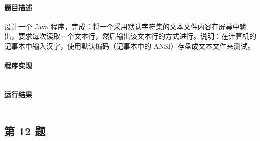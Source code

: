 \documentclass{academics}
\begin{document}
\paragraph{题目描述} {
    设计一个 Java 程序，完成：将一个采用默认字符集的文本文件内容在屏幕中输出，要求每次读取一个文本行，然后输出该文本行的方式进行。说明：在计算机的记事本中输入汉字，使用默认编码（记事本中的 ANSI）存盘成文本文件来测试。
}

\paragraph{程序实现} {
    \inputminted[label=ReadLineFile.java]{java}{../src/P11/ReadLineFile.java}
}

\paragraph{运行结果} {
    \inputminted{text}{../res/P11.out}
}

\subsection{第 12 题}
\end{document}
